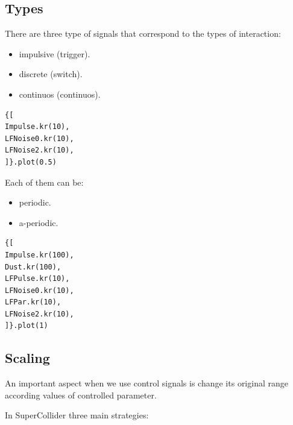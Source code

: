\subsection{Types}\label{types}

There are three type of signals that correspond to the types of interaction:

\begin{itemize}
\tightlist
\item impulsive (trigger).
\item discrete (switch).
\item continuos (continuos).
\end{itemize}

\begin{lstlisting}[frame=single] 
{[
Impulse.kr(10),
LFNoise0.kr(10),
LFNoise2.kr(10),
]}.plot(0.5)	
\end{lstlisting} 

Each of them can be:

\begin{itemize}
\tightlist
\item periodic.
\item a-periodic.
\end{itemize}

\begin{lstlisting}[frame=single] 
{[
Impulse.kr(100),
Dust.kr(100),
LFPulse.kr(10),
LFNoise0.kr(10),
LFPar.kr(10),
LFNoise2.kr(10),
]}.plot(1)
\end{lstlisting}

\subsection{Scaling}\label{scaling}

An important aspect when we use control signals is change its original range according values of controlled parameter.

In SuperCollider three main strategies:

